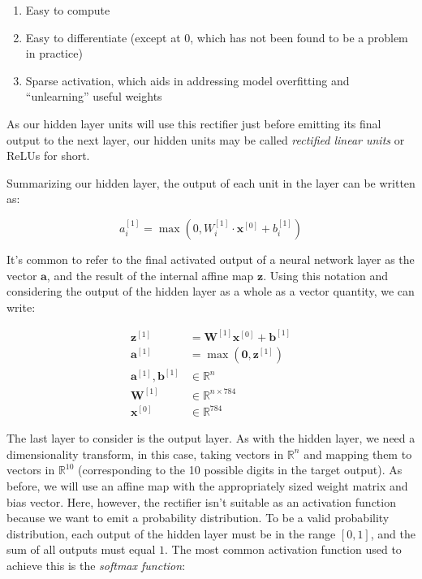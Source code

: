 \documentclass[
]{article}
\providecommand{\tightlist}{%
  \setlength{\itemsep}{0pt}\setlength{\parskip}{0pt}}
\begin{document}
\begin{enumerate}
\def\labelenumi{\arabic{enumi}.}
\tightlist
\item
  Easy to compute
\item
  Easy to differentiate (except at 0, which has not been found to be a
  problem in practice)
\item
  Sparse activation, which aids in addressing model overfitting and
  ``unlearning'' useful weights
\end{enumerate}

As our hidden layer units will use this rectifier just before emitting
its final output to the next layer, our hidden units may be called
\emph{rectified linear units} or ReLUs for short.

Summarizing our hidden layer, the output of each unit in the layer can
be written as:

\[a_i^{[1]} = \max(0, W_{i}^{[1]} \cdot \mathbf{x}^{[0]} + b_i^{[1]})\]

It's common to refer to the final activated output of a neural network
layer as the vector \(\mathbf{a}\), and the result of the internal
affine map \(\mathbf{z}\). Using this notation and considering the
output of the hidden layer as a whole as a vector quantity, we can
write:

\[
\begin{aligned}
\mathbf{z}^{[1]} &= \mathbf{W}^{[1]}\mathbf{x}^{[0]} + \mathbf{b}^{[1]} \\
\mathbf{a}^{[1]} &= \max(\mathbf{0}, \mathbf{z}^{[1]}) \\
\mathbf{a}^{[1]}, \mathbf{b}^{[1]} &\in \mathbb{R}^n \\
\mathbf{W}^{[1]} &\in \mathbb{R}^{n\times 784} \\
\mathbf{x}^{[0]} &\in \mathbb{R}^{784}
\end{aligned}
\]

The last layer to consider is the output layer. As with the hidden
layer, we need a dimensionality transform, in this case, taking vectors
in \(\mathbb{R}^n\) and mapping them to vectors in \(\mathbb{R}^{10}\)
(corresponding to the 10 possible digits in the target output). As
before, we will use an affine map with the appropriately sized weight
matrix and bias vector. Here, however, the rectifier isn't suitable as
an activation function because we want to emit a probability
distribution. To be a valid probability distribution, each output of the
hidden layer must be in the range \([0, 1]\), and the sum of all outputs
must equal \(1\). The most common activation function used to achieve
this is the \emph{softmax function}:
\end{document}
